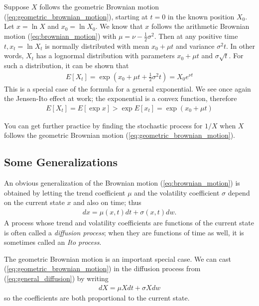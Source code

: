 \documentclass[\topdir/lecture\_notes.tex]{subfiles}
\begin{document}
Suppose $X$ follows the geometric Brownian motion (\ref{eq:geometric_brownian_motion}), starting at $t=0$ in the known position $X_{0}$. Let $x=\ln X$ and $x_{0}=\ln X_{0}$. We know that $x$ follows the arithmetic Brownian motion (\ref{eq:brownian_motion}) with $\mu=\nu-\frac{1}{2} \sigma^{2}$. Then at any positive time $t, x_{t}=\ln X_{t}$ is normally
distributed with mean $x_{0}+\mu t$ and variance $\sigma^{2} t$. In other words, $X_{t}$ has a lognormal distribution with parameters $x_{0}+\mu t$ and $\sigma \sqrt{t}$. For such a distribution, it can be shown that
\begin{align*}
E\left[X_{t}\right]=\exp \left(x_{0}+\mu t+\frac{1}{2} \sigma^{2} t\right)=X_{0} e^{\nu t}
\end{align*}
This is a special case of the formula for a general exponential. We see once again the Jensen-Ito effect at work; the exponential is a convex function, therefore
\begin{align*}
E\left[X_{t}\right]=E[\exp x]>\exp E\left[x_{t}\right]=\exp (x_{0}+\mu t)
\end{align*}

You can get further practice by finding the stochastic process for $1/X$ when $X$ follows the geometric Brownian motion (\ref{eq:geometric_brownian_motion}).

\subsection{Some Generalizations}
An obvious generalization of the Brownian motion (\ref{eq:brownian_motion}) is obtained by letting the trend coefficient $\mu$ and the volatility coefficient $\sigma$ depend on the current state $x$ and also on time; thus
\begin{align}
dx=\mu(x, t) dt+\sigma(x, t) dw. \label{eq:general_diffusion}
\end{align}
A process whose trend and volatility coefficients are functions of the current state is often called a \emph{diffusion process}; when they are functions of time as well, it is sometimes called an \emph{Ito process}.

The geometric Brownian motion is an important special case. We can cast (\ref{eq:geometric_brownian_motion}) in the diffusion process from (\ref{eq:general_diffusion}) by writing
\begin{align*}
dX=\mu X dt+\sigma X dw
\end{align*}
so the coefficients are both proportional to the current state.
\end{document}
